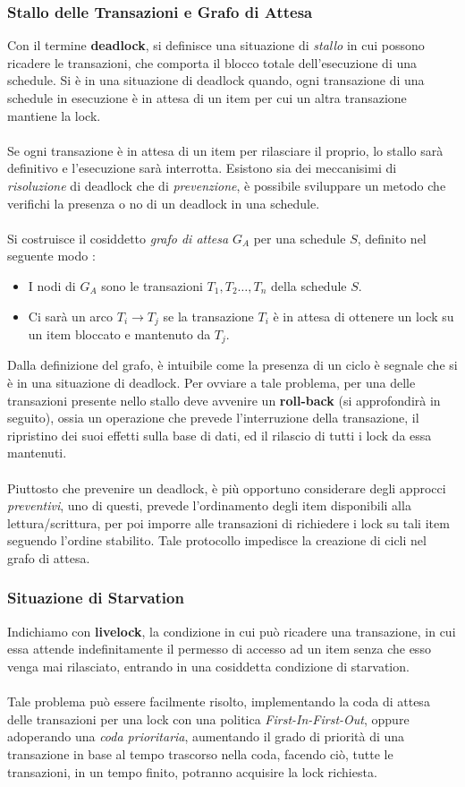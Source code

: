 \documentclass[12pt, letterpaper]{article}
\newcommand{\acc}{\\\hphantom{}\\}
\begin{document}
 \subsubsection{Stallo delle Transazioni e Grafo di Attesa}
 Con il termine \textbf{deadlock}, si definisce una situazione di \textit{stallo} in cui possono ricadere le transazioni, che 
 comporta il blocco totale dell'esecuzione di una schedule. Si è in una situazione di deadlock quando, ogni transazione 
 di una schedule in esecuzione è in attesa di un item per cui un altra transazione mantiene la lock. \acc Se ogni transazione 
 è in attesa di un item per rilasciare il proprio, lo stallo sarà definitivo e l'esecuzione sarà interrotta. Esistono sia 
 dei meccanisimi di \textit{risoluzione} di deadlock che di \textit{prevenzione}, è possibile sviluppare un metodo che verifichi 
 la presenza o no di un deadlock in una schedule.
\acc
 Si costruisce il cosiddetto \textit{grafo di attesa} \(G_A\) per una schedule \(S\), definito nel seguente modo :\begin{itemize}
    \item I nodi di \(G_A\) sono le transazioni \(T_1,T_2\dots,T_n\) della schedule \(S\). 
    \item Ci sarà un arco \(T_i\rightarrow T_j\) se la transazione \(T_i\) è in attesa di ottenere un lock su un item 
    bloccato e mantenuto da \(T_j\).
 \end{itemize}
 Dalla definizione del grafo, è intuibile come la presenza di un ciclo è segnale che si è in una situazione di deadlock.
 Per ovviare a tale problema, per una delle transazioni presente nello stallo deve avvenire un \textbf{roll-back} (si approfondirà 
 in seguito), 
 ossia un operazione che prevede l'interruzione della transazione, il ripristino dei suoi effetti sulla base di dati, 
 ed il rilascio di tutti i lock da essa mantenuti.\acc 
 Piuttosto che prevenire un deadlock, è più opportuno considerare degli approcci \textit{preventivi}, uno di questi, 
 prevede l'ordinamento degli item disponibili alla lettura/scrittura, per poi imporre alle transazioni di 
 richiedere i lock su tali item seguendo l'ordine stabilito. Tale protocollo impedisce la creazione di cicli nel 
 grafo di attesa.
\subsubsection{Situazione di Starvation}
Indichiamo con \textbf{livelock}, la condizione in cui può ricadere una transazione, in cui essa attende 
indefinitamente il permesso di accesso ad un item senza che esso venga mai rilasciato, entrando in una 
cosiddetta condizione di starvation.\acc Tale problema può essere facilmente 
risolto, implementando la coda di attesa delle transazioni per una lock con una politica \textit{First-In-First-Out}, oppure 
adoperando una \textit{coda prioritaria}, aumentando il grado di priorità di una transazione in base al tempo trascorso 
nella coda, facendo ciò, tutte le transazioni, in un tempo finito, potranno acquisire la lock richiesta.
\end{document}
